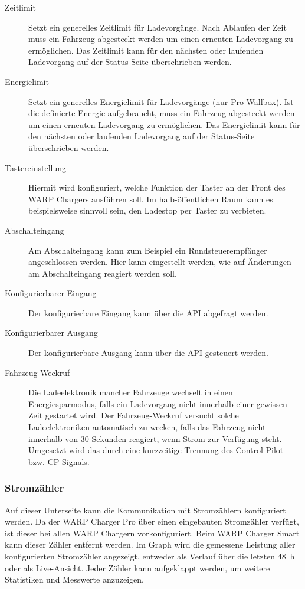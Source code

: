 \documentclass[a4paper,10pt]{article}
\begin{document}
\begin{multicols*}{2}
\begin{description}
     \item[Zeitlimit] Setzt ein generelles Zeitlimit für Ladevorgänge. Nach Ablaufen der Zeit muss ein Fahrzeug abgesteckt werden um einen erneuten Ladevorgang zu ermöglichen. Das Zeitlimit kann für den nächsten oder laufenden Ladevorgang auf der Status-Seite überschrieben werden.
     \item[Energielimit] Setzt ein generelles Energielimit für Ladevorgänge (nur Pro Wallbox). Ist die definierte Energie aufgebraucht, muss ein Fahrzeug abgesteckt werden um einen erneuten Ladevorgang zu ermöglichen. Das Energielimit kann für den nächsten oder laufenden Ladevorgang auf der Status-Seite überschrieben werden.
     \item[Tastereinstellung] Hiermit wird konfiguriert, welche Funktion der Taster an der Front
     des WARP Chargers ausführen soll. Im halb-öffentlichen Raum kann es beispielsweise sinnvoll sein,
     den Ladestop per Taster zu verbieten.
     \item[Abschalteingang] Am Abschalteingang kann zum Beispiel ein Rundsteuerempfänger angeschlossen werden.
     Hier kann eingestellt werden, wie auf Änderungen am Abschalteingang reagiert werden soll.
     \item[Konfigurierbarer Eingang] Der konfigurierbare Eingang kann über die API abgefragt werden.
     \item[Konfigurierbarer Ausgang] Der konfigurierbare Ausgang kann über die API gesteuert werden.
     \item[Fahrzeug-Weckruf] Die Ladeelektronik mancher Fahrzeuge wechselt in einen Energiesparmodus, falls ein Ladevorgang nicht innerhalb einer gewissen Zeit gestartet wird. Der Fahrzeug-Weckruf versucht solche Ladeelektroniken automatisch zu wecken, falls das Fahrzeug nicht innerhalb von 30 Sekunden reagiert, wenn Strom zur Verfügung steht. Umgesetzt wird das durch eine kurzzeitige Trennung des Control-Pilot- bzw. CP-Signals.
    \end{description}

     \vfill
     \null

    \columnbreak

    \subsubsection{Stromzähler}
    Auf dieser Unterseite kann die Kommunikation mit Stromzählern konfiguriert werden.
    Da der WARP Charger Pro über einen eingebauten Stromzähler verfügt, ist dieser bei allen WARP Chargern vorkonfiguriert.
    Beim WARP Charger Smart kann dieser Zähler entfernt werden.
    Im Graph wird die gemessene Leistung aller konfigurierten Stromzähler angezeigt, entweder als Verlauf über die letzten \SI{48}{\hour} oder als Live-Ansicht. Jeder Zähler kann aufgeklappt werden, um weitere Statistiken und
    Messwerte anzuzeigen.


\end{multicols*}
\end{document}
